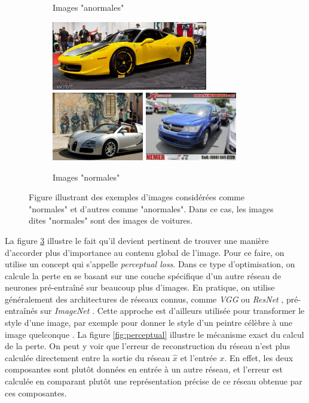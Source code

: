 \begin{figure} [htb]
\begin{subfigure}{.33\textwidth}
		\caption{Images "anormales"}
		\label{fig:sfig2}
	\end{subfigure}
	\begin{subfigure}{.33\textwidth}
		\centering
		\includegraphics[width=.8\linewidth,height=3cm]{images/images_anomalies/inlier-4}
		\includegraphics[width=.8\linewidth,height=3cm]{images/images_anomalies/inlier-5}
		\includegraphics[width=.8\linewidth,height=3cm]{images/images_anomalies/inlier-6}
		\caption{Images "normales"}
		\label{fig:sfig3}
	\end{subfigure}
	\centering
	\caption{Figure illustrant des exemples d'images considérées comme "normales" et d'autres comme "anormales". Dans ce cas, les images dites "normales" sont des images de voitures.}
	\label{fig:exemple_global}
\end{figure}

 La figure \ref{fig:exemple_global} illustre le fait qu'il devient pertinent de trouver une manière d'accorder plus d'importance au contenu global de l'image. Pour ce faire, on utilise un concept qui s'appelle \textit{perceptual loss}. Dans ce type d'optimisation, on calcule la perte en se basant sur une couche spécifique d'un autre réseau de neurones pré-entraîné sur beaucoup plus d'images. En pratique, on utilise généralement des architectures de réseaux connus,  comme \textit{VGG} \citep{DBLP:journals/corr/SimonyanZ14a}  ou \textit{ResNet} \citep{DBLP:journals/corr/HeZRS15}, pré-entraînés sur \textit{ImageNet} \citep{deng2009imagenet}. Cette approche est d'ailleurs utilisée pour transformer le style d'une image, par exemple pour donner le style d'un peintre célèbre à une image quelconque \citep{Johnson2016Perceptual}. La figure \ref{fig:perceptual} illustre le mécanisme exact du calcul de la perte. On peut y voir que l'erreur de reconstruction du réseau n'est plus calculée directement entre la sortie du réseau $\hat{x}$ et l'entrée $x$. En effet, les deux composantes sont plutôt données en entrée à un autre réseau, et l'erreur est calculée en comparant plutôt une représentation précise de ce réseau obtenue par ces \DIFdelbegin {}\DIFdelend \DIFaddbegin {}\DIFaddend composantes.

